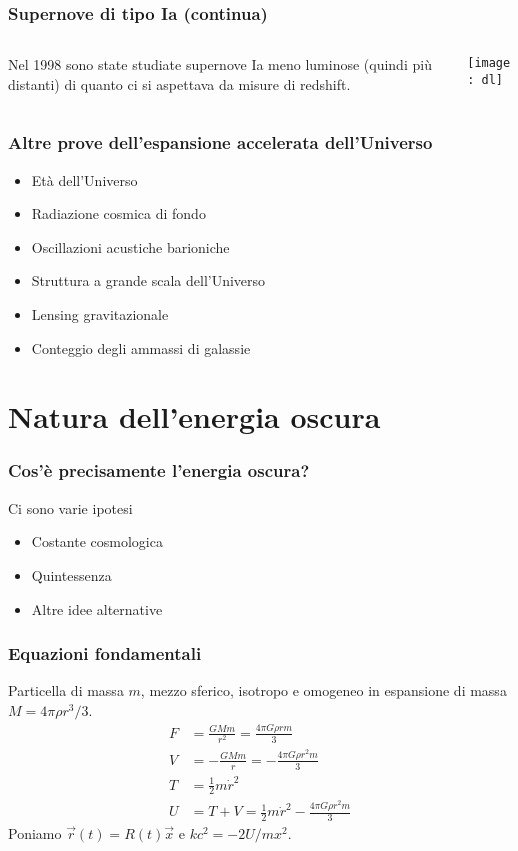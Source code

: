 \begin{frame}
  \frametitle{Supernove di tipo Ia (continua)}
  \begin{columns}
    \begin{column}{0.35\textwidth}
      Nel 1998 sono state studiate supernove Ia meno luminose (quindi più
      distanti) di quanto ci si aspettava da misure di redshift.
    \end{column}
    \begin{column}{0.6\textwidth}
      \texttt{[image: dl]}
    \end{column}
  \end{columns}
\end{frame}

\begin{frame}
  \frametitle{Altre prove dell'espansione accelerata dell'Universo}
  \begin{itemize}
  \item Età dell'Universo
  \item Radiazione cosmica di fondo
  \item Oscillazioni acustiche barioniche
  \item Struttura a grande scala dell'Universo
  \item Lensing gravitazionale
  \item Conteggio degli ammassi di galassie
  \end{itemize}
\end{frame}

\section[Natura]{Natura dell'energia oscura}

\begin{frame}
  \frametitle{Cos'è precisamente l'energia oscura?}
  Ci sono varie ipotesi
  \begin{itemize}
  \item Costante cosmologica
  \item Quintessenza
  \item Altre idee alternative
  \end{itemize}
\end{frame}

\begin{frame}
  \frametitle[]{Equazioni fondamentali}
  Particella di massa $m$, mezzo sferico, \alert{isotropo e omogeneo} in
  espansione di massa $M = 4\pi\rho r^3/3$.
  \begin{align*}
    F &= \frac{GMm}{r^2} = \frac{4\pi G \rho r m}{3} \\
    V &= -\frac{GMm}{r} = -\frac{4\pi G \rho r^2 m}{3} \\
    T &= \frac{1}{2}m\dot{r}^2 \\
    U &= T + V = \frac{1}{2}m\dot{r}^2 - \frac{4\pi G \rho r^2 m}{3}
  \end{align*}
  Poniamo $\vec{r}(t) = R(t)\vec{x}$ e $kc^2 = -2U/mx^2$.
\end{frame}

